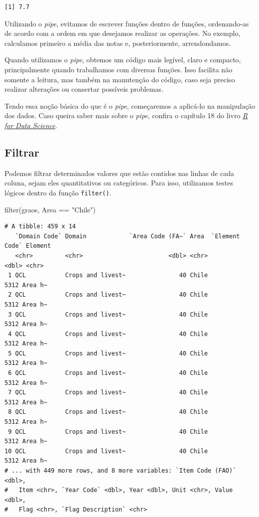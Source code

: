 \documentclass[
  brazilian,
]{book}
\newenvironment{Shaded}{\begin{snugshade}}{\end{snugshade}}
\newcommand{\FunctionTok}[1]{\textcolor[rgb]{0.00,0.00,0.00}{#1}}
\newcommand{\NormalTok}[1]{#1}
\newcommand{\SpecialCharTok}[1]{\textcolor[rgb]{0.00,0.00,0.00}{#1}}
\newcommand{\StringTok}[1]{\textcolor[rgb]{0.31,0.60,0.02}{#1}}
\begin{document}
\begin{verbatim}
[1] 7.7
\end{verbatim}

Utilizando o \emph{pipe}, evitamos de escrever funções dentro de funções, ordenando-as de acordo com a ordem em que desejamos realizar as operações. No exemplo, calculamos primeiro a média das notas e, posteriormente, arrendondamos.

Quando utilizamos o \emph{pipe}, obtemos um código mais legível, claro e compacto, principalmente quando trabalhamos com diversas funções. Isso facilita não somente a leitura, mas também na manutenção do código, caso seja preciso realizar alterações ou consertar possíveis problemas.

Tendo essa noção básica do que é o \emph{pipe}, começaremos a aplicá-lo na manipulação dos dados. Caso queira saber mais sobre o \emph{pipe}, confira o capítulo 18 do livro \href{https://r4ds.had.co.nz/pipes.html}{\emph{R for Data Science}}.

\hypertarget{filtrar}{%
\subsection{Filtrar}\label{filtrar}}

Podemos filtrar determinados valores que estão contidos nas linhas de cada coluna, sejam eles quantitativos ou categóricos. Para isso, utilizamos testes lógicos dentro da função \texttt{filter()}.

\begin{Shaded}
\begin{Highlighting}[]
\FunctionTok{filter}\NormalTok{(graos,}
\NormalTok{       Area }\SpecialCharTok{==} \StringTok{"Chile"}\NormalTok{)}
\end{Highlighting}
\end{Shaded}

\begin{verbatim}
# A tibble: 459 x 14
   `Domain Code` Domain            `Area Code (FA~` Area  `Element Code` Element
   <chr>         <chr>                        <dbl> <chr>          <dbl> <chr>  
 1 QCL           Crops and livest~               40 Chile           5312 Area h~
 2 QCL           Crops and livest~               40 Chile           5312 Area h~
 3 QCL           Crops and livest~               40 Chile           5312 Area h~
 4 QCL           Crops and livest~               40 Chile           5312 Area h~
 5 QCL           Crops and livest~               40 Chile           5312 Area h~
 6 QCL           Crops and livest~               40 Chile           5312 Area h~
 7 QCL           Crops and livest~               40 Chile           5312 Area h~
 8 QCL           Crops and livest~               40 Chile           5312 Area h~
 9 QCL           Crops and livest~               40 Chile           5312 Area h~
10 QCL           Crops and livest~               40 Chile           5312 Area h~
# ... with 449 more rows, and 8 more variables: `Item Code (FAO)` <dbl>,
#   Item <chr>, `Year Code` <dbl>, Year <dbl>, Unit <chr>, Value <dbl>,
#   Flag <chr>, `Flag Description` <chr>
\end{verbatim}
\end{document}
